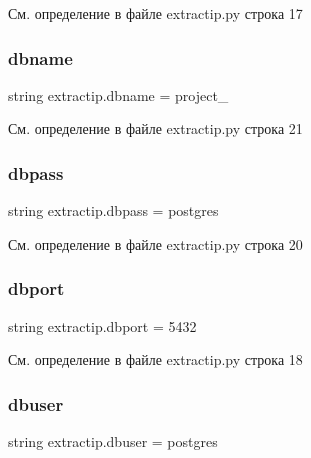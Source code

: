 См. определение в файле extractip.\+py строка 17

\mbox{\label{namespaceextractip_a9394808f1a48ea90bfa2bb86c76d01ad}} 
\subsubsection{\texorpdfstring{dbname}{dbname}}
{\footnotesize\ttfamily string extractip.\+dbname = \textquotesingle{}project\+\_\textquotesingle{}}



См. определение в файле extractip.\+py строка 21

\mbox{\label{namespaceextractip_a1cc5f8cfee8451384713192bae5cf558}} 
\subsubsection{\texorpdfstring{dbpass}{dbpass}}
{\footnotesize\ttfamily string extractip.\+dbpass = \textquotesingle{}postgres\textquotesingle{}}



См. определение в файле extractip.\+py строка 20

\mbox{\label{namespaceextractip_a37c1fd9eb8523d6a57cbd077d2075be2}} 
\subsubsection{\texorpdfstring{dbport}{dbport}}
{\footnotesize\ttfamily string extractip.\+dbport = \textquotesingle{}5432\textquotesingle{}}



См. определение в файле extractip.\+py строка 18

\mbox{\label{namespaceextractip_ae958c259d1ade44ffc42dc20f7d4b3ab}} 
\subsubsection{\texorpdfstring{dbuser}{dbuser}}
{\footnotesize\ttfamily string extractip.\+dbuser = \textquotesingle{}postgres\textquotesingle{}}



